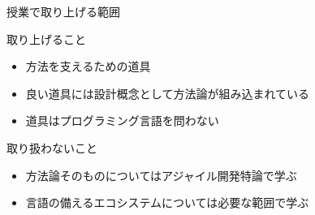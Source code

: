 \documentclass[t, aspectratio=169]{beamer}
\begin{document}
\begin{frame}[label=sec-1-4-2]{授業で取り上げる範囲}
\begin{block}{取り上げること}
\begin{itemize}
\item 方法を支えるための道具
\item 良い道具には設計概念として方法論が組み込まれている
\item 道具はプログラミング言語を問わない
\end{itemize}
\end{block}

\begin{block}{取り扱わないこと}
\begin{itemize}
\item 方法論そのものについてはアジャイル開発特論で学ぶ
\item 言語の備えるエコシステムについては必要な範囲で学ぶ
\end{itemize}
\end{block}
\end{frame}
\end{document}
